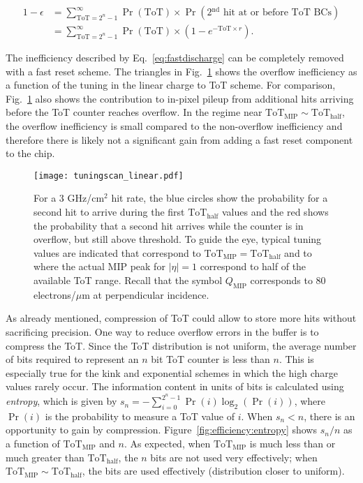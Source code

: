 \documentclass[12pt]{article}
\begin{document}
\begin{align}
\label{eq:fastdischarge}
1-\epsilon &= \sum_{\text{ToT}=2^{n}-1}^\infty \Pr(\text{ToT})\times\Pr(\text{2$^\text{nd}$ hit at or before ToT BCs})\\\nonumber
&=\sum_{\text{ToT}=2^{n}-1}^\infty \Pr(\text{ToT})\times(1-e^{-\text{ToT}\times r}).
\end{align}

\noindent The inefficiency described by Eq.~\ref{eq:fastdischarge} can be completely removed with a fast reset scheme.  The triangles in Fig.~\ref{fig:efficiency:fastdischarge} shows the overflow inefficiency as a function of the tuning in the linear charge to ToT scheme.  For comparison, Fig.~\ref{fig:efficiency:fastdischarge} also shows the contribution to in-pixel pileup from additional hits arriving before the ToT counter reaches overflow.  In the regime near $\text{ToT}_\text{MIP}\sim \text{ToT}_\text{half}$, the overflow inefficiency is small compared to the non-overflow inefficiency and therefore there is likely not a significant gain from adding a fast reset component to the chip.

\begin{figure}[h!]
\centering
\texttt{[image: tuningscan\_linear.pdf]}
\caption{For a 3 GHz/cm$^2$ hit rate, the blue circles show the probability for a second hit to arrive during the first $\text{ToT}_\text{half}$ values and the red shows the probability that a second hit arrives while the counter is in overflow, but still above threshold.  To guide the eye, typical tuning values are indicated that correspond to $\text{ToT}_\text{MIP}=\text{ToT}_\text{half}$ and to where the actual MIP peak for $|\eta|=1$ correspond to half of the available ToT range.  Recall that the symbol $Q_\text{MIP}$ corresponds to 80 electrons/$\mu$m at perpendicular incidence.}
\label{fig:efficiency:fastdischarge}
\end{figure}

As already mentioned, compression of ToT could allow to store more hits without sacrificing precision.  One way to reduce overflow errors in the buffer is to compress the ToT.  Since the ToT distribution is not uniform, the average number of bits required to represent an $n$ bit ToT counter is less than $n$.  This is especially true for the kink and exponential schemes in which the high charge values rarely occur.   The information content in units of bits is calculated using \textit{entropy}, which is given by $s_n=-\sum_{i=0}^{2^{n}-1}\Pr(i)\log_2(\Pr(i))$, where $\Pr(i)$ is the probability to measure a ToT value of $i$.  When $s_n<n$, there is an opportunity to gain by compression.  Figure~\ref{fig:efficiency:entropy} shows $s_n/n$ as a function of $\text{ToT}_\text{MIP}$ and $n$.  As expected, when $\text{ToT}_\text{MIP}$ is much less than or much greater than $\text{ToT}_\text{half}$, the $n$ bits are not used very effectively; when $\text{ToT}_\text{MIP}\sim \text{ToT}_\text{half}$, the bits are used effectively (distribution closer to uniform).
 
\end{document}
